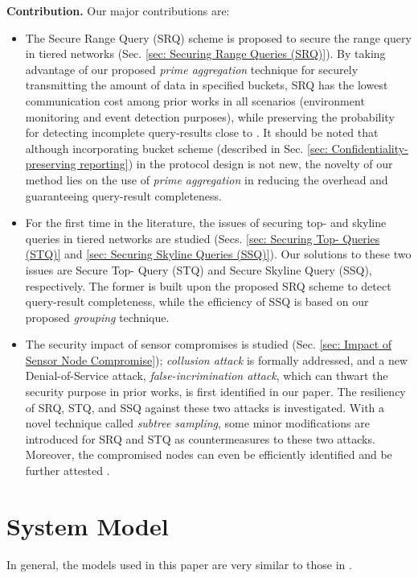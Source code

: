 \documentclass[conference]{IEEEtran}
\begin{document}
\textbf{Contribution.} Our major contributions are:
\begin{itemize}
\item The Secure Range Query (SRQ) scheme is proposed to secure the range query in tiered networks (Sec. \ref{sec: Securing Range Queries (SRQ)}). By taking advantage of our proposed \emph{prime aggregation} technique for securely transmitting the amount of data in specified buckets, SRQ has the lowest communication cost among prior works in all scenarios (environment monitoring and event detection purposes), while preserving the probability for detecting incomplete query-results close to . It should be noted that although incorporating bucket scheme \cite{hilm02,hmt04} (described in Sec. \ref{sec: Confidentiality-preserving reporting}) in the protocol design \cite{sl08,szz09,zsz09} is not new, the novelty of our method lies on the use of \emph{prime aggregation} in reducing the overhead and guaranteeing query-result completeness.

\item For the first time in the literature, the issues of securing top- and skyline queries in tiered networks are studied (Secs. \ref{sec: Securing Top- Queries (STQ)} and \ref{sec: Securing Skyline Queries (SSQ)}). Our solutions to these two issues are Secure Top- Query (STQ) and Secure Skyline Query (SSQ), respectively. The former is built upon the proposed SRQ scheme to detect query-result completeness, while the efficiency of SSQ is based on our proposed \emph{grouping} technique.

\item The security impact of sensor compromises is studied (Sec. \ref{sec: Impact of Sensor Node Compromise}); \emph{collusion attack} is formally addressed, and a new Denial-of-Service attack, \emph{false-incrimination attack}, which can thwart the security purpose in prior works, is first identified in our paper. The resiliency of SRQ, STQ, and SSQ against these two attacks is investigated. With a novel technique called \emph{subtree sampling}, some minor modifications are introduced for SRQ and STQ as countermeasures to these two attacks. Moreover, the compromised nodes can even be efficiently identified and be further attested \cite{slpdk06,smkk05,spdk04}.
\end{itemize}
\section{System Model}\label{sec: System Model}
In general, the models used in this paper are very similar to those in \cite{rksegyy03,dglls05,sl08,szz09,zsz09}.
\end{document}

